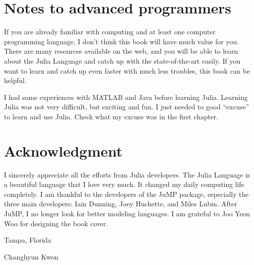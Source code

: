 \section*{Notes to advanced programmers}

If you are already familiar with computing and at least one computer programming language, I don't think this book will have much value for you. There are many resources available on the web, and you will be able to learn about the Julia Language and catch up with the state-of-the-art easily. If you want to learn and catch up even faster with much less troubles, this book can be helpful.

I had some experiences with MATLAB and Java before learning Julia. Learning Julia was not very difficult, but exciting and fun. I just needed to good ``excuse'' to learn and use Julia. Check what my excuse was in the first chapter.


\section*{Acknowledgment}

I sincerely appreciate all the efforts from Julia developers. The Julia Language is a beautiful language that I love very much. It changed my daily computing life completely. I am thankful to the developers of the JuMP package, especially the three main developers: Iain Dunning, Joey Huchette, and Miles Lubin. After JuMP, I no longer look for better modeling languages. I am grateful to Joo Yeon Woo for designing the book cover. 

\vspace{0.5cm}

\noindent Tampa, Florida

\noindent Changhyun Kwon
